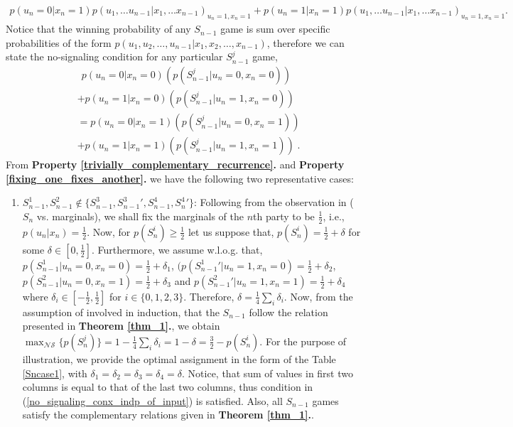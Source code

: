 \begin{widetext}
\begin{appendices}
\begin{equation}
\begin{split}
p(u_n=0|x_n=1)p(u_1,\ldots u_{n-1}|x_1,\ldots x_{n-1})_{u_n=1,x_n=1}+p(u_n=1|x_n=1)p(u_1,\ldots u_{n-1}|x_1,\ldots x_{n-1})_{u_n=1,x_n=1}.
\end{split}
\end{equation}
Notice that the winning probability of any $S_{n-1}$ game is sum over specific probabilities of the form $p(u_1,u_2,\ldots,u_{n-1}|x_1,x_2,\ldots,x_{n-1})$, therefore we can state the no-signaling condition for any particular $S_{n-1}^j$ game,
\begin{equation}
\label{no_signaling_conx_indp_of_input}
\begin{split}
&~~p(u_n=0|x_n=0)(p(S_{n-1}^j|u_n=0,x_n=0))  \\ &+p(u_n=1|x_n=0)(p(S_{n-1}^j|u_n=1,x_n=0))  \\
&= p(u_n=0|x_n=1)(p(S_{n-1}^j|u_n=0,x_n=1))  \\ &+p(u_n=1|x_n=1)(p(S_{n-1}^j|u_n=1,x_n=1))\; .
\end{split}
\end{equation}
\noindent From \textbf{Property \ref{trivially_complementary_recurrence}.} and \textbf{Property \ref{fixing_one_fixes_another}.} we have the following two representative cases:
\begin{enumerate}
\item $ S_{n-1}^1,S_{n-1}^2  \not \in \{S_{n-1}^3, {S_{n-1}^3}{'},S_{n-1}^4, {S_n^4}{'}\}$: Following from the observation in ($S_n$ vs. marginals), we shall fix the marginals of the $n$th party to be $\frac{1}{2}$, i.e., $p(u_n|x_n)=\frac{1}{2}$. Now, for $p(S_n^i) \ge \frac{1}{2}$ let us suppose that, $p(S_n^i)=\frac{1}{2}+\delta$ for some $\delta\in [0,\frac{1}{2}]$. Furthermore, we assume w.l.o.g. that, $p(S_{n-1}^1|u_n=0,x_n=0)=\frac{1}{2}+\delta_1$, $(p({S_{n-1}^1}{'}|u_n=1,x_n=0)=\frac{1}{2}+\delta_2$,  $p(S_{n-1}^2|u_n=0,x_n=1)=\frac{1}{2}+\delta_3$ and  $p({S_{n-1}^2}{'}|u_n=1,x_n=1)=\frac{1}{2}+\delta_4$ where $\delta_i \in [-\frac{1}{2},\frac{1}{2}]$ for $i \in \{0,1,2,3\}$. Therefore, $\delta=\frac{1}{4}\sum_i\delta_i$.
Now, from the assumption of involved in induction, that the $S_{n-1}$ follow the relation presented in \textbf{Theorem \ref{thm_1}.}, we obtain $\max_{\mathcal{NS}} \{p(S_n^j)\}=1-\frac{1}{4}\sum_i\delta_i=1-\delta=\frac{3}{2}-p({S_n^i})$. For the purpose of illustration, we provide the optimal assignment in the form of the Table \ref{Sncase1}, with $\delta_1=\delta_2=\delta_3=\delta_4=\delta$. Notice, that sum of values in first two columns is equal to that of the last two columns, thus condition in (\ref{no_signaling_conx_indp_of_input}) is satisfied. Also, all $S_{n-1}$ games satisfy the complementary relations given in \textbf{Theorem \ref{thm_1}.}.

\end{enumerate}
\end{appendices}
\end{widetext}

